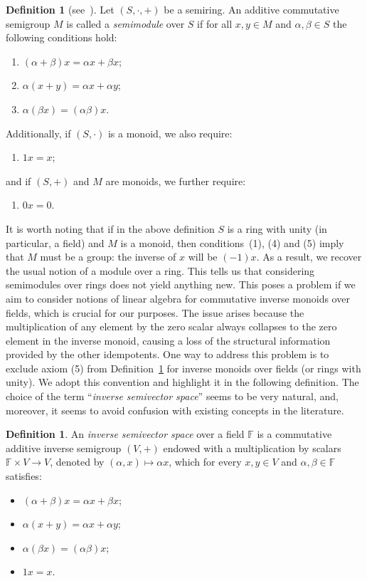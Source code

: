 \documentclass{amsart}
\newcommand{\F}{\mathbb{F}}
\newcommand{\0}{{\vartheta}}
\theoremstyle{definition}
\newtheorem{defn}[thm]{Definition}
\theoremstyle{remark}
\numberwithin{equation}{section}
\newtheorem*{Theorem A}{\textbf{Theorem A}}
\newtheorem*{Corollary E}{\textbf{Corollary E}}
\newtheorem*{Corollary F}{\textbf{Corollary F}}
\newtheorem*{Theorem B}{\textbf{Theorem B}}
\newtheorem*{Theorem C}{\textbf{Theorem C}}
\newtheorem*{Theorem D}{\textbf{Theorem B}}
\newtheorem*{p a}{\textbf{Proof of  Theorem A}}
\newtheorem*{p b}{\textbf{Proof of Theorem B}}
\newtheorem*{p c}{\textbf{Proof of  Theorem C}}
\newtheorem*{p d}{\textbf{Proof of  Theorem D}}
\begin{document}
\begin{defn}[see~\cite{Golan,Zimmermann}]\label{defsem}
Let $(S,\cdot,+)$ be a semiring.  An additive commutative semigroup $M$ is called a {\em semimodule} over $S$ if  for all $x,y\in M$ and $\alpha,\beta\in S$ the following conditions hold:
\begin{enumerate}
      \item $(\alpha+\beta)x=\alpha x+\beta x$; 
      \item $\alpha (x+y)=\alpha x+\alpha y$;
      \item $\alpha (\beta x)=(\alpha \beta)x$.
\end{enumerate}
Additionally, if $(S,\cdot)$ is a monoid, we also require:
\begin{enumerate}
    \item[(4)] $1x=x$;
\end{enumerate}
and if $(S,+)$ and $M$ are monoids, we further require: 
\begin{enumerate}
    \item[(5)] $0x=0$.
\end{enumerate}
\end{defn}

It is worth noting that if in the  above definition  $S$ is a ring with unity (in particular,  a field) and $M$ is a monoid, then conditions~(1), (4) and (5) imply that $M$ must be a group: the inverse of $x$ will be  $(-1)x$. As a result, we recover the usual notion of a module over a ring. This tells us that considering semimodules over rings does not yield anything new. This poses a problem if we aim to consider notions of linear algebra for commutative inverse monoids over fields, which is crucial for our purposes. The issue arises because the multiplication of any element by the zero scalar always collapses to the zero element in the inverse monoid, causing a loss of the structural information provided by the other idempotents. One way to address this problem is to exclude axiom (5) from Definition~\ref{defsem} for inverse monoids over fields (or rings with unity). We adopt this convention and highlight it in the following definition.  The choice of the term  ``{\em inverse semivector space}'' seems to be very natural, and, moreover, it seems to avoid confusion with existing concepts in the literature.

\begin{defn}\label{def2}
An {\em inverse semivector space} over a field $\F$  is a commutative additive inverse semigroup $(V,+)$ endowed with a multiplication by scalars $\mathbb{F} \times V \rightarrow V$, denoted by $(\alpha,x)\mapsto \alpha x$, which for every $x,y\in V$ and $\alpha,\beta\in \F$ satisfies:
\begin{itemize}
       \item[$(1)$]$(\alpha+\beta)x=\alpha x+\beta x$; 
        \item[$(2)$]$\alpha (x+y)=\alpha x+\alpha y$;
         \item[$(3)$]$\alpha (\beta x)=(\alpha \beta)x$;
          \item[$(4)$]$1x=x.$
   \end{itemize}
\end{defn}
\end{document}
